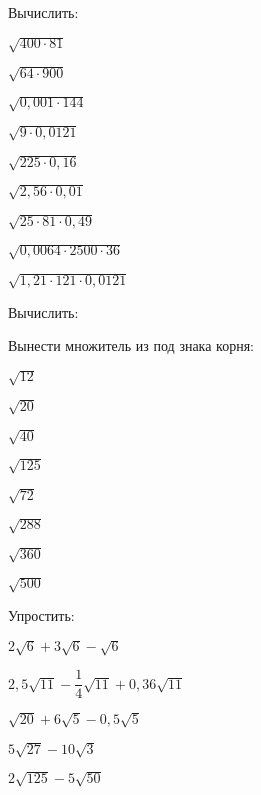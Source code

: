 \begin{class}[number=4]
	\begin{listofex}
		\item Вычислить:
		\begin{enumcols}[itemcolumns=3]
			\item \( \sqrt{400\cdot81} \)
			\item \( \sqrt{64\cdot900} \)
			\item \( \sqrt{0,001\cdot144} \)
			\item \( \sqrt{9\cdot0,0121} \)
			\item \( \sqrt{225\cdot0,16} \)
			\item \( \sqrt{2,56\cdot0,01} \)
			\item \( \sqrt{25\cdot81\cdot0,49} \)
			\item \( \sqrt{0,0064\cdot2500\cdot36} \)
			\item \( \sqrt{1,21\cdot121\cdot0,0121} \)
		\end{enumcols}
		\item Вычислить:
		\begin{enumcols}[itemcolumns=2]
			\item {}
			\item {}
		\end{enumcols}
		\item Вынести множитель из под знака корня:
		\begin{enumcols}[itemcolumns=8]
			\item \( \sqrt{12} \)
			\item \( \sqrt{20} \)
			\item \( \sqrt{40} \)
			\item \( \sqrt{125} \)
			\item \( \sqrt{72} \)
			\item \( \sqrt{288} \)
			\item \( \sqrt{360} \)
			\item \( \sqrt{500} \)
		\end{enumcols}
		\item Упростить:
		\begin{enumcols}[itemcolumns=3]
			\item \( 2\sqrt{6}+3\sqrt{6}-\sqrt{6} \)
			\item \( 2,5\sqrt{11}-\dfrac{1}{4}\sqrt{11}+0,36\sqrt{11} \)
			\item \( \sqrt{20}+6\sqrt{5}-0,5\sqrt{5} \)
			\item \( 5\sqrt{27}-10\sqrt{3} \)
			\item \( 2\sqrt{125}-5\sqrt{50} \)

\end{enumcols}
\end{listofex}
\end{class}
